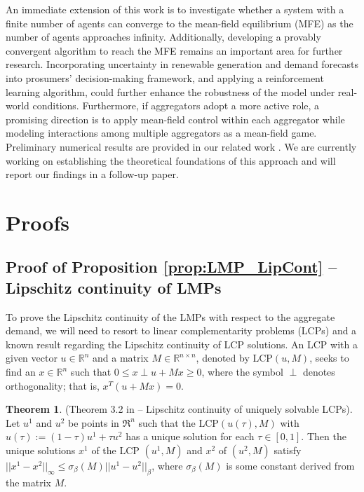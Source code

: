 \documentclass{article}
\theoremstyle{definition}
\newtheorem{theorem}{Theorem}
\theoremstyle{plain}
\begin{document}
An immediate extension of this work is to investigate whether a system with a finite number of agents can converge to the mean-field equilibrium (MFE) as the number of agents approaches infinity. Additionally, developing a provably convergent algorithm to reach the MFE remains an important area for further research.
Incorporating uncertainty in renewable generation and demand forecasts into prosumers' decision-making framework, and applying a reinforcement learning algorithm, could further enhance the robustness of the model under real-world conditions. Furthermore, if aggregators adopt a more active role, a promising direction is to apply mean-field control within each aggregator while modeling interactions among multiple aggregators as a mean-field game. Preliminary numerical results are provided in our related work \citep{HeLiu24}. We are currently working on establishing the theoretical foundations of this approach and will report our findings in a follow-up paper.




\appendix
\section{Proofs}\label{app:Proof}
\subsection{Proof of Proposition \ref{prop:LMP_LipCont} -- Lipschitz continuity of LMPs}
\label{Proof_LipCont}
To prove the Lipschitz continuity of the LMPs with respect to the aggregate demand, we will need to resort to linear complementarity problems (LCPs) and a known result regarding the Lipschitz continuity of LCP solutions. An LCP with a given vector \(u \in \mathbb{R}^n\) and a matrix \(M \in \mathbb{R}^{n \times n}\), denoted by \(\mathrm{LCP}(u, M)\), seeks to find an \(x \in \mathbb{R}^n\) such that \(0 \leq x \perp u + Mx \geq 0\), where the symbol \(\perp\) denotes orthogonality; that is, $x^T(u + Mx) = 0$.


\begin{theorem} \label{thm:Lip_LCP}
	(Theorem 3.2 in \cite{Mangasarian_LipCont} -- Lipschitz continuity of uniquely solvable LCPs).  
	Let $u^1$ and $u^2$ be points in $\Re^n$ such that the $\mathrm{LCP}(u(\tau),M)$ with $u(\tau):= (1 - \tau)u^1 + \tau u^2$ has a unique solution for each $\tau \in [0,1]$. Then the unique solutions $x^1$ of the LCP $(u^1, M)$ and $x^2$ of $(u^2, M)$ satisfy $||x^1 - x^2||_{\infty} \leq \sigma_{\beta}(M)||u^1 - u^2||_{\beta}$, where $\sigma_{\beta}(M)$ is some constant derived from the matrix $M$.    
\end{theorem}
\end{document}
